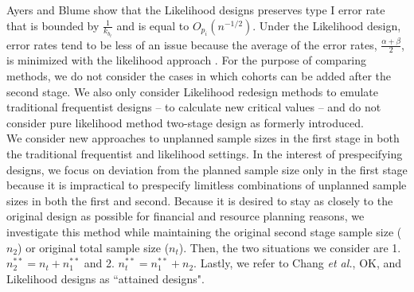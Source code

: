 \documentclass[12pt]{report}\usepackage[]{graphicx}\usepackage[]{color}
\newlength{\li}\setlength{\li}{14.48pt}
\newlength{\di}\setlength{\di}{-3.5mm}
\begin{document}
 
\indent Ayers and Blume \cite{Ayers} show that the Likelihood designs preserves type I error rate that is bounded by $\frac{1}{k_{b_t}}$ and is equal to $O_{p_i}\left({n}^{-1/2}\right)$. Under the Likelihood design, error rates tend to be less of an issue because the average of the error rates, $\frac{\alpha + \beta}{2}$, is minimized with the likelihood approach \cite{Ayers}. For the purpose of comparing methods, we do not consider the cases in which cohorts can be added after the second stage. We also only consider Likelihood redesign methods to emulate traditional frequentist designs -- to calculate new critical values -- and do not consider pure likelihood method two-stage design as formerly introduced. \\
\indent We consider new approaches to unplanned sample sizes in the first stage in both the traditional frequentist and likelihood settings. In the interest of prespecifying designs, we focus on deviation from the planned sample size only in the first stage because it is impractical to prespecify limitless combinations of unplanned sample sizes in both the first and second. Because it is desired to stay as closely to the original design as possible for financial and resource planning reasons, we investigate this method while maintaining the original second stage sample size ($n_2$) or original total sample size ($n_t$). Then, the two situations we consider are 1. $n_2^{\ast\ast} = n_t + n_1^{\ast\ast}$ and 2. $n_t^{\ast\ast} = n_1^{\ast\ast} + n_2$. Lastly, we refer to Chang \textit{et al.}, OK, and Likelihood designs as ``attained designs".
\end{document}
